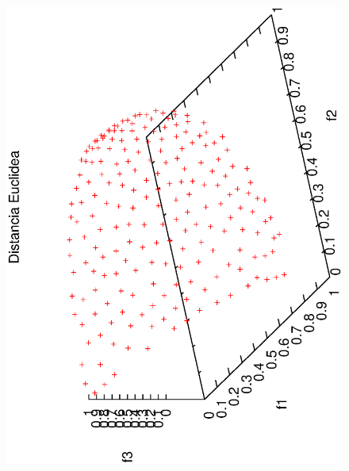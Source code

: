 \begin{figure}[H]
\centering
\scriptsize
\includegraphics[scale=0.23,angle=-90,origin=c]
{Figures_Chapter3/euclidea.eps}

\end{figure}
